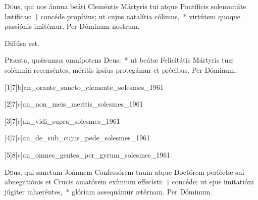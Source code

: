 \documentclass[vesperale_romanum]{subfiles}
\begin{document}

\oratio

\label{oratio_s_clementi_1}
\lettrine{D}{e}us, qui nos ánnua beáti Cleméntis Mártyris tui atque Pontíficis solemnitáte lætíficas:~† concéde propítius; ut cujus natalítia cólimus,~* virtútem quoque passiónis imitémur. Per Dóminum nostrum.



\vv Diffúsa est.


\oratio

\lettrine{P}{r}æsta, quǽsumus omnípotens Deus:~* ut beátæ Felicitátis Mártyris tuæ solémnia recenséntes, méritis ipsíus protegámur et précibus. Per Dóminum.
 
 
 [1]{7}[b]{an_orante_sancto_clemente_solesmes_1961}

[2]{7}[c]{an_non_meis_meritis_solesmes_1961}

[3]{7}[c]{an_vidi_supra_solesmes_1961}

[4]{7}[c]{an_de_sub_cujus_pede_solesmes_1961}

[5]{8}[c]{an_omnes_gentes_per_gyrum_solesmes_1961}
 

\myrule



\oratio

\lettrine{D}{e}us, qui sanctum Joánnem Confessórem tuum atque Doctórem perféctæ sui abnegatiónis et Crucis amatórem exímium effecísti:~† concéde; ut ejus imitatióni júgiter inhæréntes,~* glóriam assequámur ætérnam. Per Dóminum.
\end{document}

